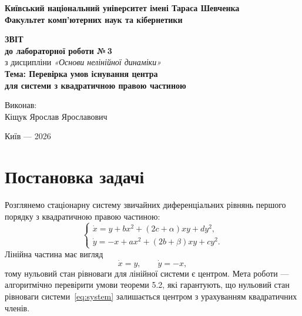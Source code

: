 \documentclass[12pt,a4paper]{article}
\begin{document}
\begin{titlepage}
    \begin{center}
        \textbf{Київський національний університет імені Тараса Шевченка}\\
        \textbf{Факультет комп'ютерних наук та кібернетики}
    \end{center}

    \vspace{4cm}

    \begin{center}
        \textbf{\Large ЗВІТ}\\
        \vspace{0.5cm}
        \textbf{\large до лабораторної роботи №\,3}\\
        \vspace{0.5cm}
        з дисципліни \textit{«Основи нелінійної динаміки»}\\
        \vspace{0.7cm}
        \textbf{Тема: Перевірка умов існування центра\\для системи з квадратичною правою частиною}
    \end{center}

    \vfill

    \begin{flushright}
        Виконав:\\
        Кіщук Ярослав Ярославович
    \end{flushright}

    \vspace{1.5cm}

    \begin{center}
        Київ --- 2026
    \end{center}
\end{titlepage}

\tableofcontents
\newpage

\section{Постановка задачі}

Розглянемо стаціонарну систему звичайних диференціальних рівнянь першого порядку з квадратичною правою частиною:
\begin{equation}\label{eq:system}
\begin{cases}
\dot{x}=y+b x^2+(2c+\alpha)xy+d y^2,\\
\dot{y}=-x+a x^2+(2b+\beta)xy+c y^2.
\end{cases}
\end{equation}
Лінійна частина має вигляд
\[
\dot{x}=y,\qquad \dot{y}=-x,
\]
тому нульовий стан рівноваги для лінійної системи є центром. Мета роботи --- алгоритмічно перевірити умови теореми 5.2, які гарантують, що нульовий стан рівноваги системи~\eqref{eq:system} залишається центром з урахуванням квадратичних членів.
\end{document}
